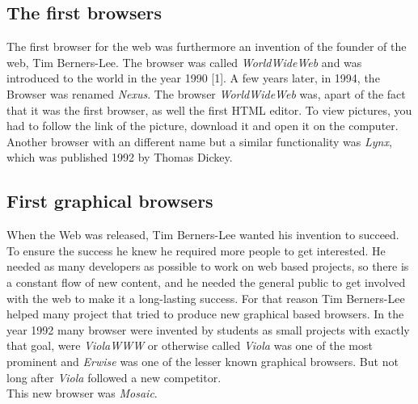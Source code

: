 \documentclass[runningheads]{llncs}
\begin{document}
		\subsection{The first browsers}
		The first browser for the web was furthermore an invention of the founder of the web, Tim Berners-Lee. The browser was called \textit{WorldWideWeb} and was introduced to the world in the year 1990 [1]. A few years later, in 1994, the Browser was renamed \textit{Nexus}. The browser \textit{WorldWideWeb} was, apart of the fact that it was the first browser, as well the first HTML editor.
		To view pictures, you had to follow the link of the picture, download it and open it on the computer. Another browser with an different name but a similar functionality was \textit{Lynx}, which was published 1992 by Thomas Dickey.
		\subsection{First graphical browsers}
		When the Web was released, Tim Berners-Lee wanted his invention to succeed. To ensure the success he knew he required more people to get interested. He needed as many developers as possible to work on web based projects, so there is a constant flow of new content, and he needed the general public to get involved with the web to make it a long-lasting success. For that reason Tim Berners-Lee helped many project that tried to produce new graphical based browsers. In the year 1992 many browser were invented by students as small projects with exactly that goal, were \textit{ViolaWWW} or otherwise called \textit{Viola} was one of the most prominent and \textit{Erwise} was one of the lesser known graphical browsers. But not long after \textit{Viola} followed a new competitor. \\This new browser was \textit{Mosaic}.
\end{document}
